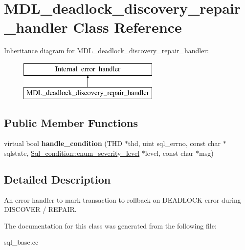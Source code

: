 \hypertarget{classMDL__deadlock__discovery__repair__handler}{}\section{M\+D\+L\+\_\+deadlock\+\_\+discovery\+\_\+repair\+\_\+handler Class Reference}
\label{classMDL__deadlock__discovery__repair__handler}
Inheritance diagram for M\+D\+L\+\_\+deadlock\+\_\+discovery\+\_\+repair\+\_\+handler\+:\begin{figure}[H]
\begin{center}
\leavevmode
\includegraphics[height=2.000000cm]{classMDL__deadlock__discovery__repair__handler}
\end{center}
\end{figure}
\subsection*{Public Member Functions}
\begin{DoxyCompactItemize}
\item 
\mbox{\label{classMDL__deadlock__discovery__repair__handler_acb8acdd5ac7cba13efe0226c48f857f5}} 
virtual bool {\bfseries handle\+\_\+condition} (T\+HD $\ast$thd, uint sql\+\_\+errno, const char $\ast$sqlstate, \mbox{\hyperlink{classSql__condition_ab0602581e19cddb609bfe10c44be4e83}{Sql\+\_\+condition\+::enum\+\_\+severity\+\_\+level}} $\ast$level, const char $\ast$msg)
\end{DoxyCompactItemize}


\subsection{Detailed Description}
An error handler to mark transaction to rollback on D\+E\+A\+D\+L\+O\+CK error during D\+I\+S\+C\+O\+V\+ER / R\+E\+P\+A\+IR. 

The documentation for this class was generated from the following file\+:\begin{DoxyCompactItemize}
\item 
sql\+\_\+base.\+cc\end{DoxyCompactItemize}

